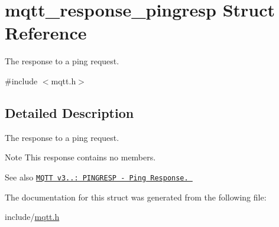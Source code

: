 \hypertarget{structmqtt__response__pingresp}{}\section{mqtt\+\_\+response\+\_\+pingresp Struct Reference}
\label{structmqtt__response__pingresp}


The response to a ping request.  




{\ttfamily \#include $<$mqtt.\+h$>$}



\subsection{Detailed Description}
The response to a ping request. 

\begin{DoxyNote}{Note}
This response contains no members.
\end{DoxyNote}
\begin{DoxySeeAlso}{See also}
\href{http://docs.oasis-open.org/mqtt/mqtt/v3.1.1/os/mqtt-v3.1.1-os.html#_Toc398718086}{\tt M\+Q\+TT v3..\+: P\+I\+N\+G\+R\+E\+SP -\/ Ping Response. } 
\end{DoxySeeAlso}


The documentation for this struct was generated from the following file\+:\begin{DoxyCompactItemize}
\item 
include/\hyperlink{mqtt_8h}{mqtt.\+h}\end{DoxyCompactItemize}
